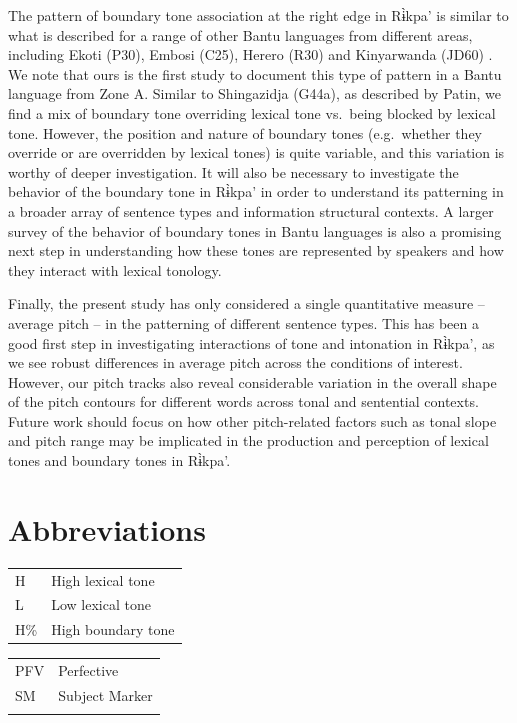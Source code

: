 \documentclass[output=paper,colorlinks,citecolor=brown
]{langscibook}
\begin{document}
The pattern of boundary tone association at the right edge in Rɨ̀kpa' is similar to what is described for a range of other Bantu languages from different areas, including Ekoti (P30), Embosi (C25), Herero (R30)  and Kinyarwanda (JD60) \citep{SchadebergMucanheia2000, MöhligEtAl2002, Kimenyi1980}. We note that ours is the first study to document this type of pattern in a Bantu language from Zone A. Similar to Shingazidja (G44a), as described by Patin, we find a mix of boundary tone overriding lexical tone vs.\ being blocked by lexical tone. However, the position and nature of boundary tones (e.g.\ whether they override or are overridden by lexical tones) is quite variable, and this variation is worthy of deeper investigation. It will also be necessary to investigate the behavior of the boundary tone in Rɨ̀kpa' in order to understand its patterning in a broader array of sentence types and information structural contexts. A larger survey of the behavior of boundary tones in Bantu languages is also a promising next step in understanding how these tones are represented by speakers and how they interact with lexical tonology. 

Finally, the present study has only considered a single quantitative measure -- average pitch -- in the patterning of different sentence types. This has been a good first step in investigating interactions of tone and intonation in Rɨ̀kpa', as we see robust differences in average pitch across the conditions of interest. However, our pitch tracks also reveal considerable variation in the overall shape of the pitch contours for different words across tonal and sentential contexts. Future work should focus on how other pitch-related factors such as tonal slope and pitch range may be implicated in the production and perception of lexical tones and boundary tones in Rɨ̀kpa'.


\section*{Abbreviations}

\begin{tabularx}{.45\textwidth}{lQ}
H& High lexical tone\\
L&	Low lexical tone\\
H\%& High boundary tone\\
\end{tabularx}
\begin{tabularx}{.45\textwidth}{lQ}
PFV& Perfective\\
SM&	 Subject Marker\\
\\
\end{tabularx}

\sloppy %

\printbibliography[heading=subbibliography,notkeyword=this]
\end{document}

